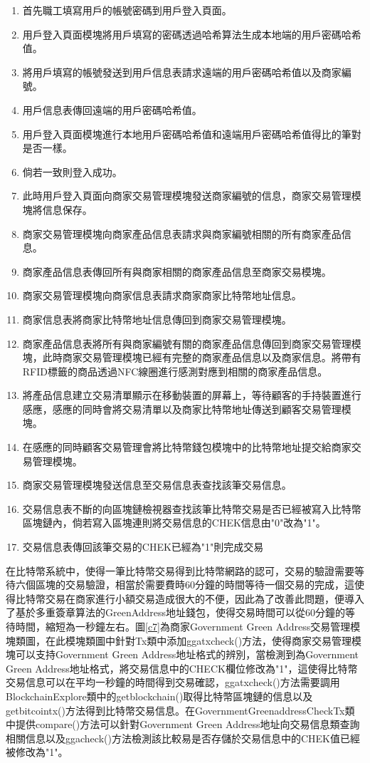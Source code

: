 	\begin{enumerate}
	\item 首先職工填寫用戶的帳號密碼到用戶登入頁面。
	\item 用戶登入頁面模塊將用戶填寫的密碼透過哈希算法生成本地端的用戶密碼哈希值。
	\item 將用戶填寫的帳號發送到用戶信息表請求遠端的用戶密碼哈希值以及商家編號。
	\item 用戶信息表傳回遠端的用戶密碼哈希值。
	\item 用戶登入頁面模塊進行本地用戶密碼哈希值和遠端用戶密碼哈希值得比的筆對是否一樣。
	\item 倘若一致則登入成功。
	\item 此時用戶登入頁面向商家交易管理模塊發送商家編號的信息，商家交易管理模塊將信息保存。
	\item 商家交易管理模塊向商家產品信息表請求與商家編號相關的所有商家產品信息。
	\item 商家產品信息表傳回所有與商家相關的商家產品信息至商家交易模塊。
	\item 商家交易管理模塊向商家信息表請求商家商家比特幣地址信息。
	\item 商家信息表將商家比特幣地址信息傳回到商家交易管理模塊。
	\item 商家產品信息表將所有與商家編號有關的商家產品信息傳回到商家交易管理模塊，此時商家交易管理模塊已經有完整的商家產品信息以及商家信息。將帶有RFID標籤的商品透過NFC線圈進行感測對應到相關的商家產品信息。
	\item 將產品信息建立交易清單顯示在移動裝置的屏幕上，等待顧客的手持裝置進行感應，感應的同時會將交易清單以及商家比特幣地址傳送到顧客交易管理模塊。

	\item 在感應的同時顧客交易管理會將比特幣錢包模塊中的比特幣地址提交給商家交易管理模塊。
	\item 商家交易管理模塊發送信息至交易信息表查找該筆交易信息。
	\item 交易信息表不斷的向區塊鏈檢視器查找該筆比特幣交易是否已經被寫入比特幣區塊鏈內，倘若寫入區塊連則將交易信息的CHEK信息由"0"改為"1"。
	\item 交易信息表傳回該筆交易的CHEK已經為"1"則完成交易
	
	\end{enumerate}

	在比特幣系統中，使得一筆比特幣交易得到比特幣網路的認可，交易的驗證需要等待六個區塊的交易驗證，相當於需要費時60分鐘的時間等待一個交易的完成，這使得比特幣交易在商家進行小額交易造成很大的不便，因此為了改善此問題，便導入了基於多重簽章算法的GreenAddress地址錢包，使得交易時間可以從60分鐘的等待時間，縮短為一秒鐘左右。圖\ref{c7}為商家Government Green Address交易管理模塊類圖，在此模塊類圖中針對Tx類中添加ggatxcheck()方法，使得商家交易管理模塊可以支持Government Green Address地址格式的辨別，當檢測到為Government Green Address地址格式，將交易信息中的CHECK欄位修改為"1"，這使得比特幣交易信息可以在平均一秒鐘的時間得到交易確認，ggatxcheck()方法需要調用BlockchainExplore類中的getblockchain()取得比特幣區塊鏈的信息以及getbitcointx()方法得到比特幣交易信息。在GovernmentGreenaddressCheckTx類中提供compare()方法可以針對Government Green Address地址向交易信息類查詢相關信息以及ggacheck()方法檢測該比較易是否存儲於交易信息中的CHEK值已經被修改為"1"。

